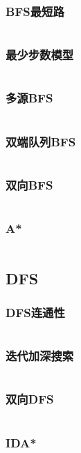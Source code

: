 \documentclass[a4paper,12pt]{article}
\begin{document}
\subsubsection{BFS最短路}
\inputminted[breaklines, linenos]{c++}{search/bfs/path.cc}
\subsubsection{最少步数模型}
\inputminted[breaklines, linenos]{c++}{search/bfs/min_step.cc}
\subsubsection{多源BFS}
\inputminted[breaklines, linenos]{c++}{search/bfs/mul_source.cc}
\subsubsection{双端队列BFS}
\inputminted[breaklines, linenos]{c++}{search/bfs/deq_bfs.cc}
\subsubsection{双向BFS}
\inputminted[breaklines, linenos]{c++}{search/bfs/2side_bfs.cc}
\subsubsection{A*}
\inputminted[breaklines, linenos]{c++}{search/bfs/astar.cc}
\subsection{DFS}
\subsubsection{DFS连通性}
\inputminted[breaklines, linenos]{c++}{search/dfs/link.cc}
\subsubsection{迭代加深搜索}
\inputminted[breaklines, linenos]{c++}{search/dfs/diedai.cc}
\subsubsection{双向DFS}
\inputminted[breaklines, linenos]{c++}{search/dfs/2side.cc}
\subsubsection{IDA*}
\inputminted[breaklines, linenos]{c++}{search/dfs/ida.cc}
\end{document}
